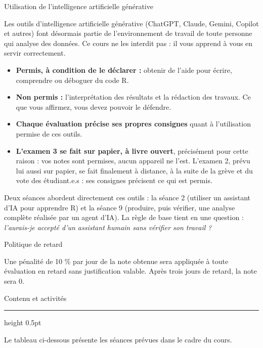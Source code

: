 \documentclass[10pt]{article}
\newcommand{\ulsection}[1]{%
  \needspace{4\baselineskip}%
  \vspace{14pt}%
  {\headfont\fontsize{17}{20}\selectfont #1}\par
  \vspace{3pt}%
  {\color{ulrule}\hrule height 0.5pt}%
  \vspace{6pt}%
}
\newcommand{\ulsub}[1]{%
  \needspace{3\baselineskip}%
  \vspace{10pt}%
  {\headfont\fontsize{12.5}{15}\selectfont #1}\par
  \vspace{2pt}%
}
\begin{document}
\ulsub{Utilisation de l'intelligence artificielle générative}
{\fontsize{9.5}{12.5}\selectfont
Les outils d'intelligence artificielle générative (ChatGPT, Claude, Gemini, Copilot et autres) font désormais partie de l'environnement de travail de toute personne qui analyse des données. Ce cours ne les interdit pas : il vous apprend à vous en servir correctement.
\begin{itemize}
  \item \textbf{Permis, à condition de le déclarer :} obtenir de l'aide pour écrire, comprendre ou déboguer du code R.
  \item \textbf{Non permis :} l'interprétation des résultats et la rédaction des travaux. Ce que vous affirmez, vous devez pouvoir le défendre.
  \item \textbf{Chaque évaluation précise ses propres consignes} quant à l'utilisation permise de ces outils.
  \item \textbf{L'examen 3 se fait sur papier, à livre ouvert}, précisément pour cette raison : vos notes sont permises, aucun appareil ne l'est. L'examen 2, prévu lui aussi sur papier, se fait finalement à distance, à la suite de la grève et du vote des étudiant.e.s : ses consignes précisent ce qui est permis.
\end{itemize}
Deux séances abordent directement ces outils : la séance 2 (utiliser un assistant d'IA pour apprendre R) et la séance 9 (produire, puis vérifier, une analyse complète réalisée par un agent d'IA). La règle de base tient en une question : \emph{l'aurais-je accepté d'un assistant humain sans vérifier son travail ?}\par}

\ulsub{Politique de retard}
{\fontsize{9.5}{12.5}\selectfont
Une pénalité de 10 \% par jour de la note obtenue sera appliquée à toute évaluation en retard sans justification valable. Après trois jours de retard, la note sera 0.\par}

\newpage

\ulsection{Contenu et activités}

{\fontsize{9.5}{12.5}\selectfont Le tableau ci-dessous présente les séances prévues dans le cadre du cours.\par}
\end{document}

